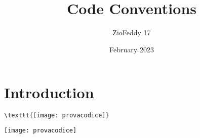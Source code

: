 \documentclass{article}
\title{Code Conventions}
\author{ZioFeddy 17}
\date{February 2023}
\begin{document}
\maketitle

\section{Introduction}
\begin{lstlisting}[language=Java, caption=Prova codice, label=prova]
    \texttt{[image: provacodice]}
\end{lstlisting}
\texttt{[image: provacodice]}
\end{document}
